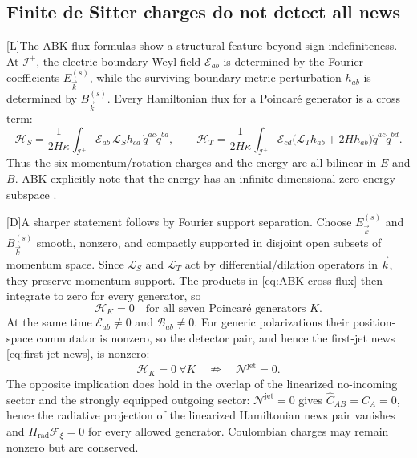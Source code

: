 \documentclass[11pt,a4paper]{article}
\newcommand{\scri}{\mathscr{I}}
\newcommand{\cE}{\mathcal{E}}
\newcommand{\cB}{\mathcal{B}}
\newcommand{\cH}{\mathcal{H}}
\newcommand{\cN}{\mathcal{N}}
\newcommand{\mathpounds}{\mathcal{L}}
\newcommand{\statusL}{\textsf{[L]}}
\newcommand{\statusD}{\textsf{[D]}}
\begin{document}
\subsection{Finite de Sitter charges do not detect all news}

\statusL The ABK flux formulas show a structural feature beyond sign indefiniteness.  At \(\scri^+\), the electric boundary Weyl field \(\cE_{ab}\) is determined by the Fourier coefficients \(E_{\vec k}^{(s)}\), while the surviving boundary metric perturbation \(h_{ab}\) is determined by \(B_{\vec k}^{(s)}\).  Every Hamiltonian flux for a Poincaré generator is a cross term:
\begin{equation}\label{eq:ABK-cross-flux}
  \cH_S
  =
  \frac{1}{2H\kappa}
  \int_{\scri^+}
  \cE_{ab}\,\mathpounds_S h_{cd}\,\mathring q^{ac}\mathring q^{bd},
  \qquad
  \cH_T
  =
  \frac{1}{2H\kappa}
  \int_{\scri^+}
  \cE_{cd}\big(\mathpounds_T h_{ab}+2Hh_{ab}\big)
  \mathring q^{ac}\mathring q^{bd}.
\end{equation}
Thus the six momentum/rotation charges and the energy are all bilinear in \(E\) and \(B\).  ABK explicitly note that the energy has an infinite-dimensional zero-energy subspace \cite{ashtekar2015linear}.

\statusD A sharper statement follows by Fourier support separation.  Choose \(E_{\vec k}^{(s)}\) and \(B_{\vec k}^{(s)}\) smooth, nonzero, and compactly supported in disjoint open subsets of momentum space.  Since \(\mathpounds_S\) and \(\mathpounds_T\) act by differential/dilation operators in \(\vec k\), they preserve momentum support.  The products in \eqref{eq:ABK-cross-flux} then integrate to zero for every generator, so
\begin{equation}\label{eq:all-Poincare-flux-zero}
  \cH_K=0
  \quad\text{for all seven Poincaré generators }K .
\end{equation}
At the same time \(\cE_{ab}\neq0\) and \(\cB_{ab}\neq0\).  For generic polarizations their position-space commutator is nonzero, so the detector pair, and hence the first-jet news \eqref{eq:first-jet-news}, is nonzero:
\begin{equation}
  \cH_K=0\ \forall K
  \quad\nRightarrow\quad
  \cN^{\mathrm{jet}}=0 .
\end{equation}
The opposite implication does hold in the overlap of the linearized no-incoming sector and the strongly equipped outgoing sector: \(\cN^{\mathrm{jet}}=0\) gives \(\hat C_{AB}=C_A=0\), hence the radiative projection of the linearized Hamiltonian news pair vanishes and \(\Pi_{\mathrm{rad}}\mathcal F_\xi=0\) for every allowed generator.  Coulombian charges may remain nonzero but are conserved.
\end{document}
